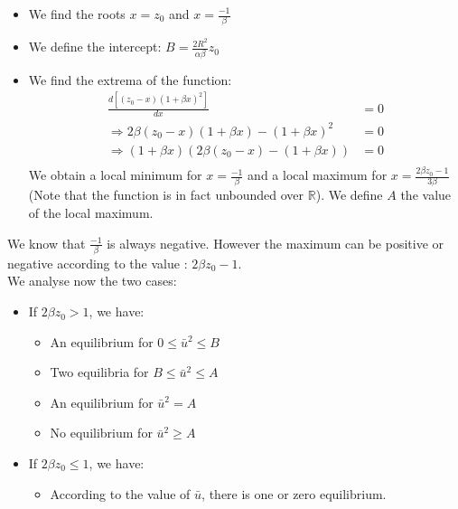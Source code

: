 \begin{itemize}
\item We find the roots $x = z_0$ and $x = \frac{-1}{\beta} $
\item We define the intercept: $B = \frac{2R^2}{\alpha \beta} z_0 $
\item We find the extrema of the function: \begin{align*}
\frac{d\left[ (z_0 - x) (1+ \beta x)^2 \right]}{dx} &= 0 \\
\Rightarrow  2 \beta (z_0 - x) (1+ \beta x) - (1+ \beta x)^2 &= 0 \\
\Rightarrow   (1+ \beta x)     \left( 2 \beta (z_0 - x)- (1+ \beta x) \right) &= 0 \\
\end{align*}
We obtain a local minimum for $x = \frac{-1}{\beta}$ and a local maximum for $x = \frac{2\beta z_0 -1}{3 \beta} $ (Note that the function is in fact unbounded over $\mathbb{R}$).
We define $A$ the value of the local maximum.
\end{itemize}

We know that $\frac{-1}{\beta}$ is always negative. However the maximum can be positive or negative according to the value : $2\beta z_0 -1 $. \\
 We analyse now the two cases: 
\begin{itemize}
\item If $2\beta z_0 > 1$, we have: 
 \begin{itemize}
\item An equilibrium for $0 \le \bar{u}^2 \le B $ 
\item Two equilibria for $B \le \bar{u}^2 \le A  $
\item An equilibrium for $\bar{u}^2 = A  $
\item No equilibrium for $ \bar{u}^2 \ge A  $
\end{itemize}
\item If $2\beta z_0 \le 1$, we have: 
\begin{itemize}
\item According to the value of $\bar{u}$, there is one or zero equilibrium. 
\end{itemize}
\end{itemize}

